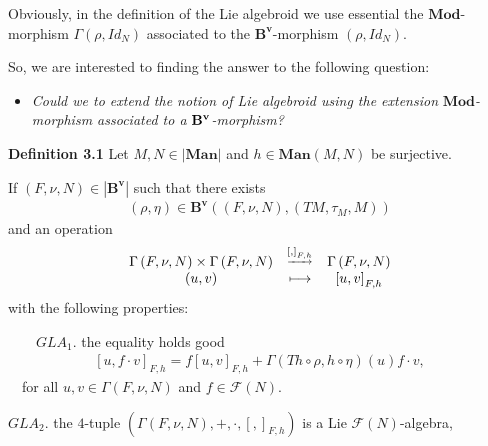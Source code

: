 \documentclass[11pt]{article}
\begin{document}
Obviously, in the definition of the Lie algebroid we use essential the $%
\mathbf{Mod}$-morphism $\Gamma \left( \rho ,Id_{N}\right) $ associated to
the $\mathbf{B}^{\mathbf{v}}$-morphism $\left( \rho ,Id_{N}\right) .$

So, we are interested to finding the answer to the following question:

\begin{itemize}
\item \emph{Could we to extend the notion of Lie algebroid using the
extension }$\mathbf{Mod}$\emph{-morphism associated to a }$\mathbf{B}^{%
\mathbf{v}}$\emph{-morphism?}
\end{itemize}

\textbf{Definition 3.1 }Let $M,N\in \left\vert \mathbf{Man}\right\vert $ and
$h\in \mathbf{Man}\left( M,N\right) $ be surjective.

If $\left( F,\nu ,N\right) \in \left\vert \mathbf{B}^{\mathbf{v}}\right\vert
$ such that there exists
\begin{equation*}
\begin{array}{c}
\left( \rho ,\eta \right) \in \mathbf{B}^{\mathbf{v}}\left( \left( F,\nu
,N\right) ,\left( TM,\tau _{M},M\right) \right)%
\end{array}%
\end{equation*}%
and an operation
\begin{equation*}
\begin{array}{ccc}
\Gamma \left( F,\nu ,N\right) \times \Gamma \left( F,\nu ,N\right) & ^{%
\underrightarrow{\left[ ,\right] _{F,h}}} & \Gamma \left( F,\nu ,N\right) \\
\left( u,v\right) & \longmapsto & \left[ u,v\right] _{F,h}%
\end{array}%
\end{equation*}%
with the following properties:\bigskip

\noindent $\qquad GLA_{1}$. the equality holds good
\begin{equation*}
\begin{array}{c}
\left[ u,f\cdot v\right] _{F,h}=f\left[ u,v\right] _{F,h}+\Gamma \left(
Th\circ \rho ,h\circ \eta \right) \left( u\right) f\cdot v,%
\end{array}%
\end{equation*}%
\qquad \quad\ \ for all $u,v\in \Gamma \left( F,\nu ,N\right) $ and $f\in
\mathcal{F}\left( N\right) .$

\medskip $GLA_{2}$. the $4$-tuple $\left( \Gamma \left( F,\nu ,N\right)
,+,\cdot ,\left[ ,\right] _{F,h}\right) $ is a Lie $\mathcal{F}\left(
N\right) $-algebra,
\end{document}
